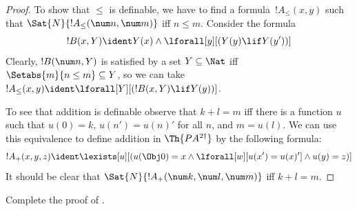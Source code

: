 \documentclass[../../../include/open-logic-section]{subfiles}
\begin{document}
\begin{proof}
To show that $\le$ is definable, we have to find a formula~$!A_\le(x, y)$
such that $\Sat{N}{!A_\le(\num n, \num m)}$ iff $n \le m$. Consider the formula
\[
!B(x, Y) \ident Y(x) \land \lforall[y][(Y(y) \lif Y(y'))]
\]
Clearly, $!B(\num n, Y)$ is satisfied by a set $Y \subseteq \Nat$ iff
$\Setabs{m}{n \le m} \subseteq Y$, so we can take $!A_\le(x, y) \ident
\lforall[Y][(!B(x, Y) \lif Y(y))]$.

To see that addition is definable observe that $k+l=m$ iff there is a
function $u$ such that $u(0)=k$, $u(n')=u(n)'$ for all $n$, and $m = u(l)$. 
We can use this equivalence to define addition in $\Th{PA^{2\dagger}}$ 
by the following formula:
\[
!A_+(x,y,z) \ident \lexists[u][(u(\Obj 0)=x \land \lforall[w][u(x')=u
 (x)'] \land u(y)=z)]
\] 
It should be clear that $\Sat{N}{!A_+(\num k, \num l, \num m)}$ 
iff $k+l=m$.
\end{proof}

\begin{prob}
Complete the proof of .
\end{prob}
\end{document}
